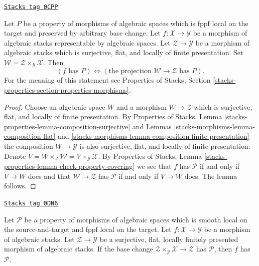 \begin{lemma}
\label{stacks-morphisms-lemma-check-property-after-fppf-base-change}
\href{https://stacks.math.columbia.edu/tag/0CPP}{\texttt{Stacks tag 0CPP}}

Let $P$ be a property of morphisms of algebraic spaces which is
fppf local on the target and preserved by arbitrary base change.
Let $f : \mathcal{X} \to \mathcal{Y}$ be a morphism of algebraic stacks
representable by algebraic spaces.
Let $\mathcal{Z} \to \mathcal{Y}$ be a morphism of algebraic stacks which
is surjective, flat, and locally of finite presentation.
Set $\mathcal{W} = \mathcal{Z} \times_\mathcal{Y} \mathcal{X}$. Then
$$
(f\text{ has }P) \Leftrightarrow
(\text{the projection }\mathcal{W} \to \mathcal{Z}\text{ has }P).
$$
For the meaning of this statement see
Properties of Stacks, Section
\ref{stacks-properties-section-properties-morphisms}.
\end{lemma}

\begin{proof}
Choose an algebraic space $W$ and a morphism
$W \to \mathcal{Z}$ which is surjective, flat, and locally of finite
presentation. By
Properties of Stacks, Lemma
\ref{stacks-properties-lemma-composition-surjective}
and Lemmas \ref{stacks-morphisms-lemma-composition-flat} and
\ref{stacks-morphisms-lemma-composition-finite-presentation}
the composition $W \to \mathcal{Y}$ is also surjective, flat, and
locally of finite presentation. Denote
$V = W \times_\mathcal{Z} \mathcal{W} = V \times_\mathcal{Y} \mathcal{X}$.
By Properties of Stacks, Lemma
\ref{stacks-properties-lemma-check-property-covering}
we see that $f$ has $\mathcal{P}$ if and only if $V \to W$ does
and that $\mathcal{W} \to \mathcal{Z}$ has $\mathcal{P}$ if and only
if $V \to W$ does. The lemma follows.
\end{proof}

\begin{lemma}
\label{stacks-morphisms-lemma-descent-property}
\href{https://stacks.math.columbia.edu/tag/0DN6}{\texttt{Stacks tag 0DN6}}

Let $\mathcal{P}$ be a property of morphisms of algebraic spaces
which is smooth local on the source-and-target and fppf local
on the target.
Let $f : \mathcal{X} \to \mathcal{Y}$ be a morphism of algebraic stacks.
Let $\mathcal{Z} \to \mathcal{Y}$ be a surjective, flat, locally finitely
presented morphism of algebraic stacks. If the base change
$\mathcal{Z} \times_\mathcal{Y} \mathcal{X} \to \mathcal{Z}$
has $\mathcal{P}$, then $f$ has $\mathcal{P}$.
\end{lemma}

